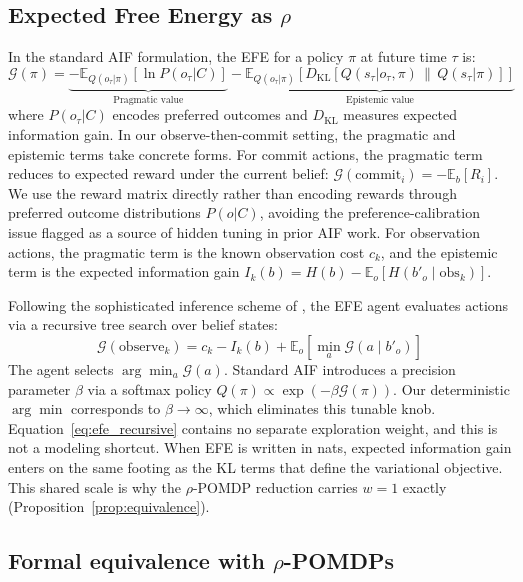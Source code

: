 \documentclass[runningheads]{llncs}
\begin{document}
\subsection{Expected Free Energy as $\rho$}

In the standard AIF formulation, the EFE for a policy $\pi$ at future time $\tau$ is:
\begin{equation}
    \mathcal{G}(\pi) = \underbrace{- \mathbb{E}_{Q(o_\tau|\pi)}[\ln P(o_\tau|C)]}_{\text{Pragmatic value}} - \underbrace{\mathbb{E}_{Q(o_\tau|\pi)}\left[D_{\mathrm{KL}}\left[Q(s_\tau|o_\tau, \pi) \,\|\, Q(s_\tau|\pi)\right]\right]}_{\text{Epistemic value}}
\end{equation}
where $P(o_\tau|C)$ encodes preferred outcomes and $D_{\mathrm{KL}}$ measures expected information gain. In our observe-then-commit setting, the pragmatic and epistemic terms take concrete forms. For commit actions, the pragmatic term reduces to expected reward under the current belief: $\mathcal{G}(\text{commit}_i) = -\mathbb{E}_b[R_i]$. We use the reward matrix directly rather than encoding rewards through preferred outcome distributions $P(o|C)$, avoiding the preference-calibration issue flagged as a source of hidden tuning in prior AIF work. For observation actions, the pragmatic term is the known observation cost $c_k$, and the epistemic term is the expected information gain $I_k(b) = H(b) - \mathbb{E}_o[H(b'_o \mid \text{obs}_k)]$.

Following the sophisticated inference scheme of \citet{friston2021}, the EFE agent evaluates actions via a recursive tree search over belief states:
\begin{equation}
    \mathcal{G}(\text{observe}_k) = c_k - I_k(b) + \mathbb{E}_{o}\!\left[\min_a \mathcal{G}(a \mid b'_o)\right]
    \label{eq:efe_recursive}
\end{equation}
The agent selects $\arg\min_a \mathcal{G}(a)$. Standard AIF introduces a precision parameter $\beta$ via a softmax policy $Q(\pi) \propto \exp(-\beta \mathcal{G}(\pi))$. Our deterministic $\arg\min$ corresponds to $\beta \to \infty$, which eliminates this tunable knob. Equation~\ref{eq:efe_recursive} contains no separate exploration weight, and this is not a modeling shortcut. When EFE is written in nats, expected information gain enters on the same footing as the KL terms that define the variational objective. This shared scale is why the $\rho$-POMDP reduction carries $w{=}1$ exactly (Proposition~\ref{prop:equivalence}).

\subsection{Formal equivalence with $\rho$-POMDPs}
\label{subsec:formal_rho_equiv}
\end{document}
